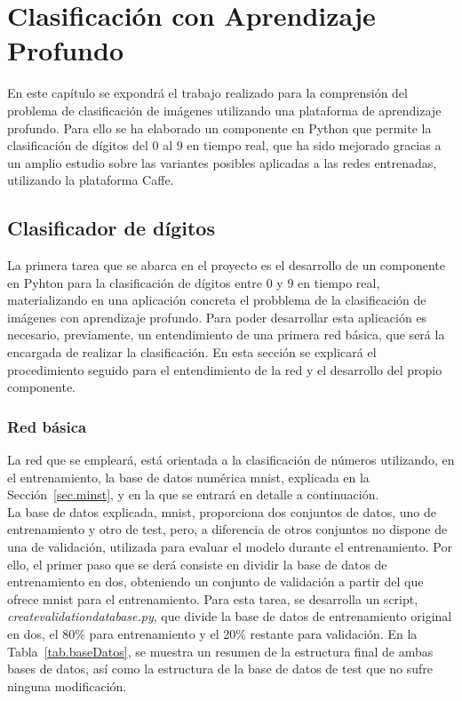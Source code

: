 \chapter{Clasificación con Aprendizaje Profundo}\label{cap.clasificacion}
En este capítulo se expondrá el trabajo realizado para la comprensión del problema de clasificación de imágenes utilizando una plataforma de aprendizaje profundo. Para ello se ha elaborado un componente en Python que permite la clasificación de dígitos del 0 al 9 en tiempo real, que ha sido mejorado gracias a un amplio estudio sobre las variantes posibles aplicadas a las redes entrenadas, utilizando la plataforma Caffe.\\

\section{Clasificador de dígitos}
La primera tarea que se abarca en el proyecto es el desarrollo de un componente en Pyhton para la clasificación de dígitos entre 0 y 9 en tiempo real, materializando en una aplicación concreta el probblema de la clasificación de imágenes con aprendizaje profundo. Para poder desarrollar esta aplicación es necesario, previamente, un entendimiento de una primera red básica, que será la encargada de realizar la clasificación. En esta sección se explicará el procedimiento seguido para el entendimiento de la red y el desarrollo del propio componente.\\

\subsection{Red básica}\label{sec.red}
La red que se empleará, está orientada a la clasificación de números utilizando, en el entrenamiento, la base de datos numérica \acrshort{mnist}, explicada en la Sección~\ref{sec.minst}, y en la que se entrará en detalle a continuación.\\

La base de datos explicada, \acrshort{mnist}, proporciona dos conjuntos de datos, uno de entrenamiento y otro de test, pero, a diferencia de otros conjuntos no dispone de una de validación, utilizada para evaluar el modelo durante el entrenamiento. Por ello, el primer paso que se derá consiste en dividir la base de datos de entrenamiento en dos, obteniendo un conjunto de validación a partir del que ofrece \acrshort{mnist} para el entrenamiento. Para esta tarea, se desarrolla un script, \textit{createvalidationdatabase.py}, que divide la base de datos de entrenamiento original en dos, el 80\% para entrenamiento y el 20\% restante para validación. En la Tabla~\ref{tab.baseDatos}, se muestra un resumen de la estructura final de ambas bases de datos, así como la estructura de la base de datos de test que no sufre ninguna modificación.\\

